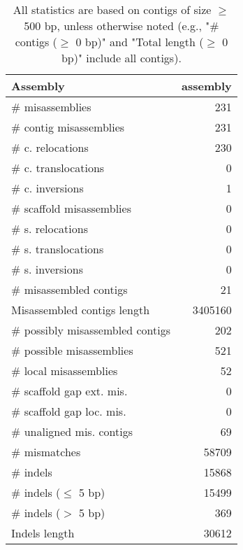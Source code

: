 \documentclass[12pt,a4paper]{article}
\begin{document}
\begin{table}[ht]
\begin{center}
\caption{All statistics are based on contigs of size $\geq$ 500 bp, unless otherwise noted (e.g., "\# contigs ($\geq$ 0 bp)" and "Total length ($\geq$ 0 bp)" include all contigs).}
\begin{tabular}{|l*{1}{|r}|}
\hline
Assembly & assembly \\ \hline
\# misassemblies & 231 \\ \hline
\hspace{2mm}\# contig misassemblies & 231 \\ \hline
\hspace{5mm}\# c. relocations & 230 \\ \hline
\hspace{5mm}\# c. translocations & 0 \\ \hline
\hspace{5mm}\# c. inversions & 1 \\ \hline
\hspace{2mm}\# scaffold misassemblies & 0 \\ \hline
\hspace{5mm}\# s. relocations & 0 \\ \hline
\hspace{5mm}\# s. translocations & 0 \\ \hline
\hspace{5mm}\# s. inversions & 0 \\ \hline
\# misassembled contigs & 21 \\ \hline
Misassembled contigs length & 3405160 \\ \hline
\# possibly misassembled contigs & 202 \\ \hline
\hspace{5mm}\# possible misassemblies & 521 \\ \hline
\# local misassemblies & 52 \\ \hline
\# scaffold gap ext. mis. & 0 \\ \hline
\# scaffold gap loc. mis. & 0 \\ \hline
\# unaligned mis. contigs & 69 \\ \hline
\# mismatches & 58709 \\ \hline
\# indels & 15868 \\ \hline
\hspace{5mm}\# indels ($\leq$ 5 bp) & 15499 \\ \hline
\hspace{5mm}\# indels ($>$ 5 bp) & 369 \\ \hline
Indels length & 30612 \\ \hline
\end{tabular}
\end{center}
\end{table}
\end{document}
